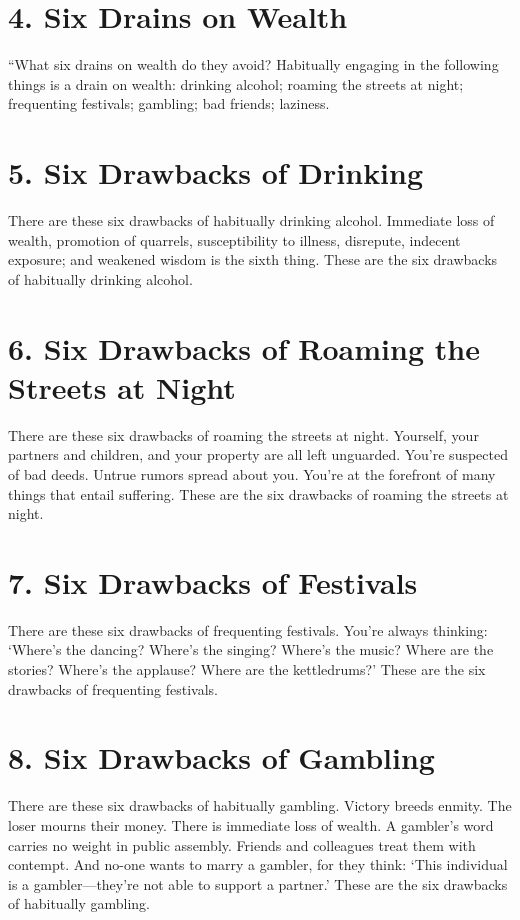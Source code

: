 \documentclass[12pt,openany]{book}%
\begin{document}
\section*{4. Six Drains on Wealth }

“What six drains on wealth do they avoid? Habitually engaging in the following things is a drain on wealth: drinking alcohol; roaming the streets at night; frequenting festivals; gambling; bad friends; laziness. 

\section*{5. Six Drawbacks of Drinking }

There are these six drawbacks of habitually drinking alcohol. Immediate loss of wealth, promotion of quarrels, susceptibility to illness, disrepute, indecent exposure; and weakened wisdom is the sixth thing. These are the six drawbacks of habitually drinking alcohol. 

\section*{6. Six Drawbacks of Roaming the Streets at Night }

There are these six drawbacks of roaming the streets at night. Yourself, your partners and children, and your property are all left unguarded. You’re suspected of bad deeds. Untrue rumors spread about you. You’re at the forefront of many things that entail suffering. These are the six drawbacks of roaming the streets at night. 

\section*{7. Six Drawbacks of Festivals }

There are these six drawbacks of frequenting festivals. You’re always thinking: ‘Where’s the dancing? Where’s the singing? Where’s the music? Where are the stories? Where’s the applause? Where are the kettledrums?’ These are the six drawbacks of frequenting festivals. 

\section*{8. Six Drawbacks of Gambling }

There are these six drawbacks of habitually gambling. Victory breeds enmity. The loser mourns their money. There is immediate loss of wealth. A gambler’s word carries no weight in public assembly. Friends and colleagues treat them with contempt. And no-one wants to marry a gambler, for they think: ‘This individual is a gambler—they’re not able to support a partner.’ These are the six drawbacks of habitually gambling. 
\end{document}
